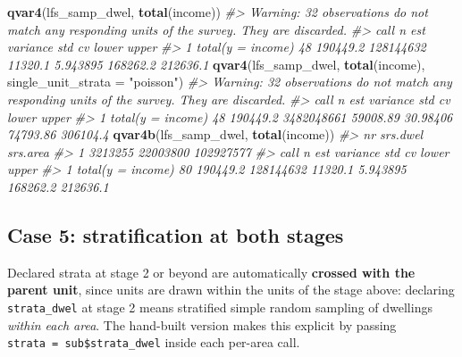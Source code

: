 \documentclass[
]{article}
\newenvironment{Shaded}{\begin{snugshade}}{\end{snugshade}}
\newcommand{\AttributeTok}[1]{\textcolor[rgb]{0.13,0.29,0.53}{#1}}
\newcommand{\CommentTok}[1]{\textcolor[rgb]{0.56,0.35,0.01}{\textit{#1}}}
\newcommand{\DecValTok}[1]{\textcolor[rgb]{0.00,0.00,0.81}{#1}}
\newcommand{\FunctionTok}[1]{\textcolor[rgb]{0.13,0.29,0.53}{\textbf{#1}}}
\newcommand{\NormalTok}[1]{#1}
\newcommand{\OtherTok}[1]{\textcolor[rgb]{0.56,0.35,0.01}{#1}}
\newcommand{\SpecialCharTok}[1]{\textcolor[rgb]{0.81,0.36,0.00}{\textbf{#1}}}
\newcommand{\StringTok}[1]{\textcolor[rgb]{0.31,0.60,0.02}{#1}}
\begin{document}
\begin{Shaded}
\begin{Highlighting}[]
\FunctionTok{qvar4}\NormalTok{(lfs\_samp\_dwel, }\FunctionTok{total}\NormalTok{(income))}
\CommentTok{\#\textgreater{} Warning: 32 observations do not match any responding units of the survey. They are discarded.}
\CommentTok{\#\textgreater{}                call  n      est  variance     std       cv    lower    upper}
\CommentTok{\#\textgreater{} 1 total(y = income) 48 190449.2 128144632 11320.1 5.943895 168262.2 212636.1}
\FunctionTok{qvar4}\NormalTok{(lfs\_samp\_dwel, }\FunctionTok{total}\NormalTok{(income), }\AttributeTok{single\_unit\_strata =} \StringTok{"poisson"}\NormalTok{)}
\CommentTok{\#\textgreater{} Warning: 32 observations do not match any responding units of the survey. They are discarded.}
\CommentTok{\#\textgreater{}                call  n      est   variance      std       cv    lower    upper}
\CommentTok{\#\textgreater{} 1 total(y = income) 48 190449.2 3482048661 59008.89 30.98406 74793.86 306104.4}
\FunctionTok{qvar4b}\NormalTok{(lfs\_samp\_dwel, }\FunctionTok{total}\NormalTok{(income))}
\CommentTok{\#\textgreater{}        nr srs.dwel  srs.area}
\CommentTok{\#\textgreater{} 1 3213255 22003800 102927577}
\CommentTok{\#\textgreater{}                call  n      est  variance     std       cv    lower    upper}
\CommentTok{\#\textgreater{} 1 total(y = income) 80 190449.2 128144632 11320.1 5.943895 168262.2 212636.1}
\end{Highlighting}
\end{Shaded}

\subsection{Case 5: stratification at both
stages}\label{case-5-stratification-at-both-stages}

Declared strata at stage 2 or beyond are automatically \textbf{crossed
with the parent unit}, since units are drawn within the units of the
stage above: declaring \texttt{strata\_dwel} at stage 2 means stratified
simple random sampling of dwellings \emph{within each area}. The
hand-built version makes this explicit by passing
\texttt{strata\ =\ sub\$strata\_dwel} inside each per-area call.

\begin{Shaded}
\end{Shaded}
\end{document}
